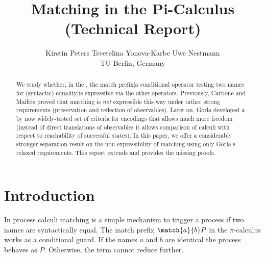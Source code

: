 \documentclass[]{article}
\title{Matching in the Pi-Calculus (Technical Report)}
\author{Kirstin Peters \qquad\qquad Tsvetelina Yonova-Karbe \qquad\qquad Uwe Nestmann\vspace{0.5em}\\
TU Berlin, Germany}
\begin{document}
\maketitle



\begin{abstract}
	We study whether, in the \piCal, the {match prefix}|{a} conditional operator testing two names for (syntactic) {equality}|{is} expressible via the other operators.
	Previously, Carbone and Maffeis proved that matching is \emph{not} expressible this way under rather strong requirements (preservation and reflection of observables).
	Later on, Gorla developed a by now widely-tested set of criteria for encodings that allows much more freedom (\eg instead of direct translations of observables it allows comparison of calculi with respect to reachability of successful states).
    In this paper, we offer a considerably stronger separation result on the non-expressibility of matching using only Gorla's relaxed requirements.
    This report extends \cite{pyn14} and provides the missing proofs.
\end{abstract}



\section{Introduction}

In process calculi matching is a simple mechanism to trigger a process if two names are syntactically equal. The match prefix $ \match{a}{b}P $ in the $\pi$-calculus works as a conditional guard. If the names $ a $ and $ b $ are identical the process behaves as $ P $. Otherwise, the term cannot reduce further.
\end{document}
